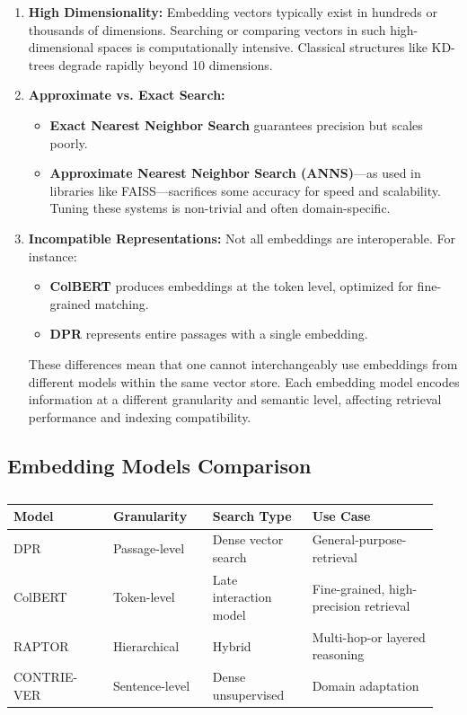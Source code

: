 \documentclass[twocolumn, 10pt]{article}
\begin{document}
\begin{enumerate}
    \item \textbf{High Dimensionality:} Embedding vectors typically exist in hundreds or thousands of dimensions. Searching or comparing vectors in such high-dimensional spaces is computationally intensive. Classical structures like KD-trees degrade rapidly beyond 10 dimensions.
    
    \item \textbf{Approximate vs. Exact Search:}
    \begin{itemize}
        \item \textbf{Exact Nearest Neighbor Search} guarantees precision but scales poorly.
        \item \textbf{Approximate Nearest Neighbor Search (ANNS)}—as used in libraries like FAISS—sacrifices some accuracy for speed and scalability. Tuning these systems is non-trivial and often domain-specific.
    \end{itemize}
    
    \item \textbf{Incompatible Representations:} 
    Not all embeddings are interoperable. For instance:
    \begin{itemize}
        \item \textbf{ColBERT} produces embeddings at the token level, optimized for fine-grained matching.
        \item \textbf{DPR} represents entire passages with a single embedding.
    \end{itemize}
    These differences mean that one cannot interchangeably use embeddings from different models within the same vector store. Each embedding model encodes information at a different granularity and semantic level, affecting retrieval performance and indexing compatibility.
\end{enumerate}

\subsection*{Embedding Models Comparison}

\begin{table}[H]
\centering
\begin{tabular}{|p{0.22\linewidth}|p{0.22\linewidth}|p{0.22\linewidth}|p{0.28\linewidth}|}
\hline
\textbf{Model} & \textbf{Granularity} & \textbf{Search Type} & \textbf{Use Case} \\
\hline
DPR & Passage-level & Dense vector search& General-purpose-retrieval \\
\hline
ColBERT & Token-level & Late interaction model& Fine-grained, high-precision retrieval \\
\hline
RAPTOR & Hierarchical & Hybrid & Multi-hop-or layered reasoning \\
\hline
CONTRIE-VER & Sentence-level & Dense unsupervised & Domain adaptation \\
\hline
\end{tabular}
\caption{}
\label{tab:embedding-models}
\end{table}
\end{document}
